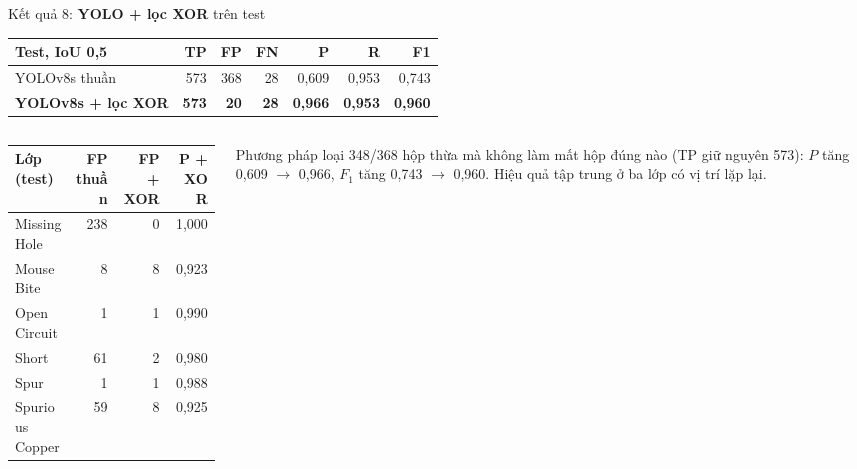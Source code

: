 \documentclass[aspectratio=169,11pt,t]{beamer}
\newcommand{\hl}[1]{{\bfseries\color{coral}#1}}
\newcommand{\hdr}[1]{{\bfseries\color{muted}#1}}
\begin{document}

\begin{frame}{Kết quả 8: \hl{YOLO + lọc XOR} trên test}
  \centering
  \footnotesize
  \renewcommand{\arraystretch}{1.3}\setlength{\tabcolsep}{6pt}
  \begin{tabular}{@{}lrrrrrr@{}}
    \toprule
    \hdr{Test, IoU 0,5} & \hdr{TP} & \hdr{FP} & \hdr{FN} & \hdr{P} & \hdr{R} & \hdr{F1} \\
    \midrule
    YOLOv8s thuần & 573 & 368 & 28 & 0,609 & 0,953 & 0,743 \\
    \rowcolor{teal!12}
    \textbf{YOLOv8s + lọc XOR} & \textbf{573} & \textbf{20} & \textbf{28} & \textbf{0,966} & \textbf{0,953} & \textbf{0,960} \\
    \bottomrule
  \end{tabular}
  \vspace{6pt}\par
  \begin{columns}[T,onlytextwidth]
    \begin{column}{0.52\textwidth}
      \footnotesize
      \renewcommand{\arraystretch}{1.25}\setlength{\tabcolsep}{2pt}
      \begin{tabular}{@{}lrrr@{}}
        \toprule
        \hdr{Lớp (test)} & \hdr{FP thuần} & \hdr{FP + XOR} & \hdr{P + XOR} \\
        \midrule
        Missing Hole & 238 & \cellcolor{teal!15}0 & 1,000 \\
        Mouse Bite & 8 & 8 & 0,923 \\
        Open Circuit & 1 & 1 & 0,990 \\
        Short & 61 & \cellcolor{teal!15}2 & 0,980 \\
        Spur & 1 & 1 & 0,988 \\
        Spurious Copper & 59 & \cellcolor{teal!15}8 & 0,925 \\
        \bottomrule
      \end{tabular}
    \end{column}
    \begin{column}{0.44\textwidth}
      \raggedright
      \begin{key}
        \footnotesize Phương pháp loại 348/368 hộp thừa mà không làm mất hộp đúng nào (TP giữ nguyên 573): $P$ tăng 0,609 $\to$ 0,966, $F_1$ tăng 0,743 $\to$ 0,960. Hiệu quả tập trung ở ba lớp có vị trí lặp lại.
      \end{key}
    \end{column}
  \end{columns}
\end{frame}
\end{document}
